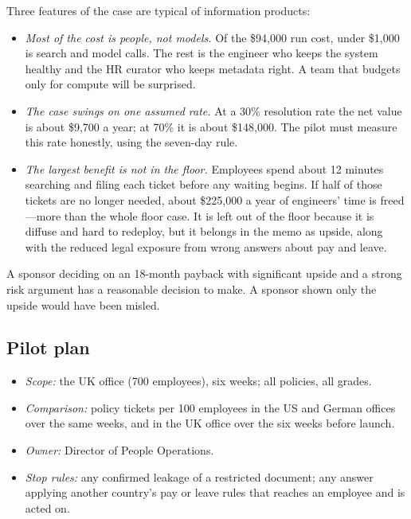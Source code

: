 Three features of the case are typical of information products:
\begin{itemize}[itemsep=2pt]
  \item \emph{Most of the cost is people, not models.} Of the \$94{,}000 run cost, under \$1{,}000 is search and model calls. The rest is the engineer who keeps the system healthy and the HR curator who keeps metadata right. A team that budgets only for compute will be surprised.
  \item \emph{The case swings on one assumed rate.} At a 30\% resolution rate the net value is about \$9{,}700 a year; at 70\% it is about \$148{,}000. The pilot must measure this rate honestly, using the seven-day rule.
  \item \emph{The largest benefit is not in the floor.} Employees spend about 12 minutes searching and filing each ticket before any waiting begins. If half of those tickets are no longer needed, about \$225{,}000 a year of engineers' time is freed---more than the whole floor case. It is left out of the floor because it is diffuse and hard to redeploy, but it belongs in the memo as upside, along with the reduced legal exposure from wrong answers about pay and leave.
\end{itemize}

A sponsor deciding on an 18-month payback with significant upside and a strong risk argument has a reasonable decision to make. A sponsor shown only the upside would have been misled.

\subsection{Pilot plan}

\begin{itemize}[itemsep=1pt]
  \item \emph{Scope:} the UK office (700 employees), six weeks; all policies, all grades.
  \item \emph{Comparison:} policy tickets per 100 employees in the US and German offices over the same weeks, and in the UK office over the six weeks before launch.
  \item \emph{Owner:} Director of People Operations.
  \item \emph{Stop rules:} any confirmed leakage of a restricted document; any answer applying another country's pay or leave rules that reaches an employee and is acted on.
\end{itemize}

